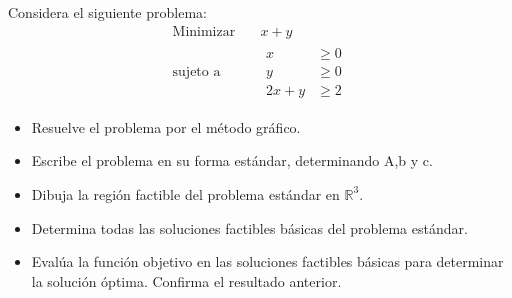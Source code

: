 \documentclass{article}
\begin{document}
Considera el siguiente problema:
\begin{equation*}
  \begin{aligned}
    \text{Minimizar}\quad & x+y \\
    \text{sujeto a}\quad &
    \begin{aligned}
      x & \geq 0\\
      y & \geq 0\\
      2x+y & \geq 2
      \end{aligned}    
   \end{aligned}
 \end{equation*}
 \begin{itemize}
 \item Resuelve el problema por el método gráfico.
 \item Escribe el problema en su forma estándar, determinando A,b y c.
 \item Dibuja la región factible del problema estándar en  $\mathbb{R}^3$.
 \item Determina todas las soluciones factibles básicas del problema estándar.
   \item Evalúa la función objetivo en las soluciones factibles básicas para determinar la solución óptima. Confirma el resultado anterior.
   \end{itemize}
\end{document}
